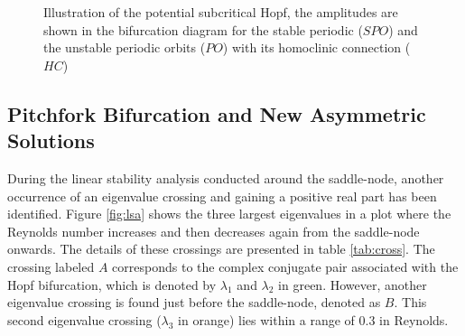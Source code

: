 \begin{figure}[h!]
\centering
{}
\caption{Illustration of the potential subcritical Hopf, the amplitudes are
shown in the bifurcation diagram for the stable periodic ($SPO$) and the
unstable periodic orbits ($PO$) with its homoclinic connection ($HC$)} 
\label{fig:sub_hopf_sketch}
\end{figure}

\subsection{Pitchfork Bifurcation and New Asymmetric Solutions}

During the linear stability analysis conducted around the saddle-node, another
occurrence of an eigenvalue crossing and gaining a positive real part has been
identified. Figure \ref{fig:lsa} shows the three largest eigenvalues in a plot
where the Reynolds number increases and then decreases again from the
saddle-node onwards. The details of these crossings are presented in table
\ref{tab:cross}. The crossing labeled $A$ corresponds to the complex conjugate
pair associated with the Hopf bifurcation, which is denoted by $\lambda_1$ and
$\lambda_2$ in green. However, another eigenvalue crossing is found just before
the saddle-node, denoted as $B$. This second eigenvalue crossing ($\lambda_3$
in orange) lies within a range of $0.3$ in Reynolds. \\\\

